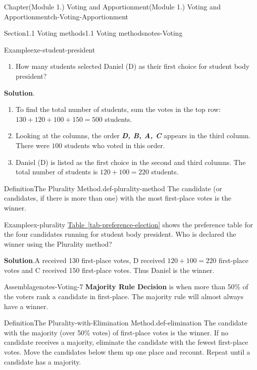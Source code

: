 \documentclass[oneside,10pt,]{book}
\newcommand{\blocktitlefont}{\relax}
\newcommand{\xreffont}{\relax}
\newcommand{\alert}[1]{\textbf{\textit{#1}}}
\newcommand{\terminology}[1]{\textbf{#1}}
\begin{document}
\begin{chapterptx}{Chapter}{(Module 1.) Voting and Apportionment}{}{(Module 1.) Voting and Apportionment}{}{}{ch-Voting-Apportionment}
\begin{sectionptx}{Section}{1.1 Voting methods}{}{1.1 Voting methods}{}{}{notes-Voting}
\begin{example}{Example}{}{exe-student-president}
\begin{enumerate}
\item{}How many students selected Daniel (D) as their first choice for student body president?%
\end{enumerate}
%
\par\smallskip%
\noindent\textbf{\blocktitlefont Solution}.\hypertarget{exe-student-president-2}{}\quad{}%
\begin{enumerate}
\item{}To find the total number of students, sum the votes in the top row: \(130 + 120 + 100 + 150 = 500\) students.%
\item{}Looking at the columns, the order \alert{D, B, A, C} appears in the third column. There were \(100\) students who voted in this order.%
\item{}Daniel (D) is listed as the first choice in the second and third columns. The total number of students is \(120 + 100 = 220\) students.%
\end{enumerate}
%
\end{example}
\begin{definition}{Definition}{The Plurality Method.}{def-plurality-method}%
The candidate (or candidates, if there is more than one) with the most first-place votes is the winner.%
\end{definition}
\begin{example}{Example}{}{ex-plurality}%
\hyperref[tab-preference-election]{Table~{\xreffont\ref{tab-preference-election}}} shows the preference table for the four candidates running for student body president. Who is declared the winner using the Plurality method?%
\par\smallskip%
\noindent\textbf{\blocktitlefont Solution}.\hypertarget{ex-plurality-2}{}\quad{}A received 130 first-place votes, D received \(120+100=220\) first-place votes and C received 150 first-place votes. Thus Daniel is the winner.%
\end{example}
\begin{assemblage}{Assemblage}{}{notes-Voting-7}%
\terminology{Majority Rule Decision} is when more than 50\% of the voters rank a candidate in first-place. The majority rule will almost always have a winner.%
\end{assemblage}
\begin{definition}{Definition}{The Plurality-with-Elimination Method.}{def-elimination}%
The candidate with the majority (over 50\% votes) of first-place votes is the winner. If no candidate receives a majority, eliminate the candidate with the fewest first-place votes. Move the candidates below them up one place and recount. Repeat until a candidate has a majority.%

\end{definition}
\end{sectionptx}
\end{chapterptx}
\end{document}
